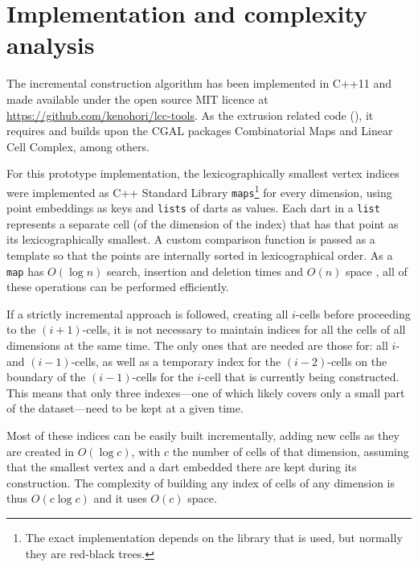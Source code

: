 \section{Implementation and complexity analysis}
\label{se:incremental-implementation}

The incremental construction algorithm has been implemented in C++11 and made available under the open source MIT licence at \url{https://github.com/kenohori/lcc-tools}.
As the extrusion related code (), it requires and builds upon the CGAL packages Combinatorial Maps and Linear Cell Complex, among others.

For this prototype implementation, the lexicographically smallest vertex indices were implemented as C++ Standard Library \texttt{maps}\footnote{The exact implementation depends on the library that is used, but normally they are red-black trees.} for every dimension, using point embeddings as keys and \texttt{lists} of darts as values.
Each dart in a \texttt{list} represents a separate cell (of the dimension of the index) that has that point as its lexicographically smallest.
A custom comparison function is passed as a template so that the points are internally sorted in lexicographical order.
As a \texttt{map} has $O(\log n)$ search, insertion and deletion times and $O(n)$ space \citep[\S{}23.4]{ISO14882:2015}, all of these operations can be performed efficiently.

If a strictly incremental approach is followed, creating all $i$-cells before proceeding to the $(i+1)$-cells, it is not necessary to maintain indices for all the cells of all dimensions at the same time.
The only ones that are needed are those for: all $i$- and $(i-1)$-cells, as well as a temporary index for the $(i-2)$-cells on the boundary of the $(i-1)$-cells for the $i$-cell that is currently being constructed.
This means that only three indexes---one of which likely covers only a small part of the dataset---need to be kept at a given time.

Most of these indices can be easily built incrementally, adding new cells as they are created in $O(\log c)$, with $c$ the number of cells of that dimension, assuming that the smallest vertex and a dart embedded there are kept during its construction.
The complexity of building any index of cells of any dimension is thus $O(c \log c)$ and it uses $O(c)$ space.

